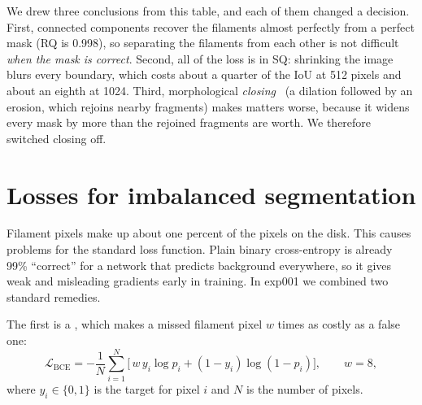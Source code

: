 We drew three conclusions from this table, and each of them changed a decision. First, connected
components recover the filaments almost perfectly from a perfect mask (RQ is 0.998), so separating
the filaments from each other is not difficult \emph{when the mask is correct}. Second, all of the
loss is in SQ: shrinking the image blurs every boundary, which costs about a quarter of the IoU at
512 pixels and about an eighth at 1024. Third, morphological \emph{closing}~\citep{serra1982} (a dilation followed
by an erosion, which rejoins nearby fragments) makes matters worse, because it widens every mask by
more than the rejoined fragments are worth. We therefore switched closing off.

\section{Losses for imbalanced segmentation}\label{sec:par-loss}
Filament pixels make up about one percent of the pixels on the disk. This  causes problems for the standard loss function. Plain binary cross-entropy is already
99\% ``correct'' for a network that predicts background everywhere, so it gives weak and misleading
gradients early in training. In exp001 we combined two standard remedies.

The first is a , which makes a missed filament pixel $w$
times as costly as a false one:
\begin{equation}
\mathcal{L}_{\mathrm{BCE}} = -\frac{1}{N}\sum_{i=1}^{N}\Big[\,w\,y_i\log p_i + (1-y_i)\log(1-p_i)\Big],
\qquad w = 8,
\label{eq:par-bce}
\end{equation}
where $y_i\in\{0,1\}$ is the target for pixel $i$ and $N$ is the number of pixels.

